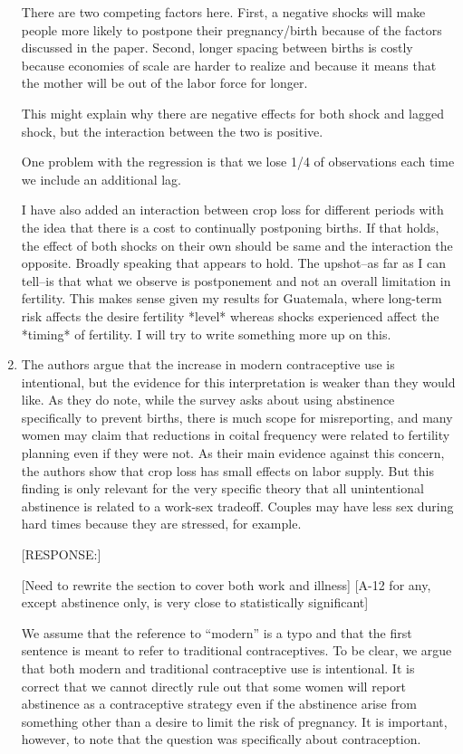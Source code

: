 \documentclass[letterpaper,12pt]{article}
\begin{document}
\begin{enumerate}
There are two competing factors here.
First, a negative shocks will make people more likely to postpone 
their pregnancy/birth because of the factors discussed in the
paper.
Second, longer spacing between births is costly because economies
of scale are harder to realize and because it means that the mother
will be out of the labor force for longer.

This might explain why there are negative effects for both shock
and lagged shock, but the interaction between the two is positive.

One problem with the regression is that we lose 1/4 of observations
each time we include an additional lag.




I have also added an interaction between crop loss for different periods
with the idea that there is a cost to continually postponing births. If
that holds, the effect of both shocks on their own should be same and
the interaction the opposite. Broadly speaking that appears to hold. The
upshot–as far as I can tell–is that what we observe is postponement and
not an overall limitation in fertility. This makes sense given my
results for Guatemala, where long-term risk affects the desire fertility
*level* whereas shocks experienced affect the *timing* of fertility. I
will try to write something more up on this.

\item The authors argue that the increase in modern contraceptive use is
intentional, but the evidence for this interpretation is weaker than
they would like. As they do note, while the survey asks about using
abstinence specifically to prevent births, there is much scope for
misreporting, and many women may claim that reductions in coital
frequency were related to fertility planning even if they were not. As
their main evidence against this concern, the authors show that crop
loss has small effects on labor supply. But this finding is only
relevant for the very specific theory that all unintentional abstinence
is related to a work-sex tradeoff. Couples may have less sex during hard
times because they are stressed, for example.

[RESPONSE:] 

[Need to rewrite the section to cover both work and illness]
[A-12 for any, except abstinence only, is very close to statistically significant]

We assume that the reference to ``modern'' is a typo and that the
first sentence is meant to refer to traditional contraceptives.
To be clear, we argue that both modern and traditional contraceptive
use is intentional.
It is correct that we cannot directly rule out that some women will 
report abstinence as a contraceptive strategy even if the abstinence 
arise from something other than a desire to limit the risk of pregnancy.
It is important, however, to note that the question was specifically
about contraception.


\end{enumerate}
\end{document}
